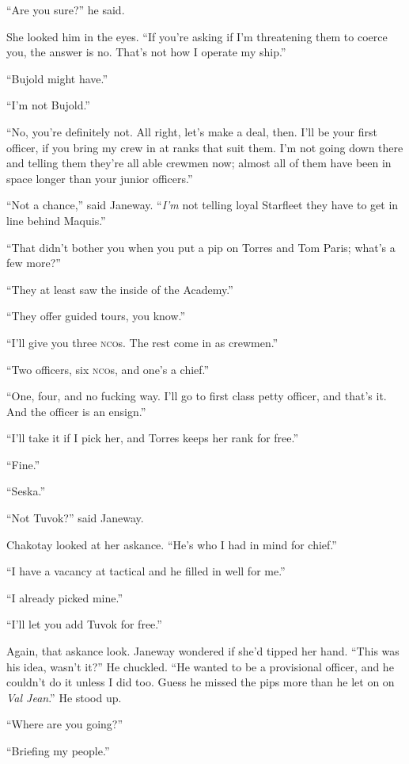 \documentclass[twoside,letterpaper,12pt]{memoir}
\begin{document}
``Are you sure?” he said. 

She looked him in the eyes. ``If you’re asking if I’m threatening them to coerce you, the answer is no. That’s not how I operate my ship.” 

``Bujold might have.” 

``I’m not Bujold.” 

``No, you’re definitely not. All right, let’s make a deal, then. I’ll be your first officer, if you bring my crew in at ranks that suit them. I’m not going down there and telling them they’re all able crewmen now; almost all of them have been in space longer than your junior officers.” 

``Not a chance,” said Janeway. ``\textit{I’m} not telling loyal Starfleet they have to get in line behind Maquis.” 

``That didn’t bother you when you put a pip on Torres and Tom Paris; what’s a few more?” 

``They at least saw the inside of the Academy.” 

``They offer guided tours, you know.” 

``I’ll give you three \textsc{nco}s. The rest come in as crewmen.” 

``Two officers, six \textsc{nco}s, and one’s a chief.” 

``One, four, and no fucking way. I’ll go to first class petty officer, and that’s it. And the officer is an ensign.” 

``I’ll take it if I pick her, and Torres keeps her rank for free.” 

``Fine.” 

``Seska.” 

``Not Tuvok?” said Janeway. 

Chakotay looked at her askance. ``He’s who I had in mind for chief.” 

``I have a vacancy at tactical and he filled in well for me.” 

``I already picked mine.” 

``I’ll let you add Tuvok for free.” 

Again, that askance look. Janeway wondered if she’d tipped her hand. ``This was his idea, wasn’t it?” He chuckled. ``He wanted to be a provisional officer, and he couldn’t do it unless I did too. Guess he missed the pips more than he let on on \textit{Val Jean}.” He stood up. 

``Where are you going?” 

``Briefing my people.” 
\end{document}
